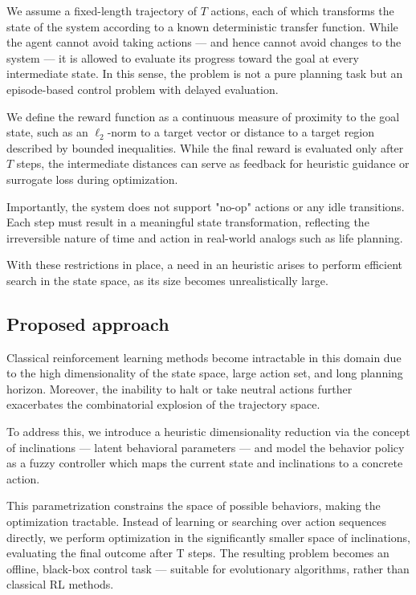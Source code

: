 \documentclass[11pt, a4paper]{article}
\begin{document}
We assume a fixed-length trajectory of $𝑇$ actions, each of which transforms the state of the system according to a known deterministic transfer function. While the agent cannot avoid taking actions — and hence cannot avoid changes to the system — it is allowed to evaluate its progress toward the goal at every intermediate state. In this sense, the problem is not a pure planning task but an episode-based control problem with delayed evaluation.

We define the reward function as a continuous measure of proximity to the goal state, such as an $\ell_2$-norm to a target vector or distance to a target region described by bounded inequalities. While the final reward is evaluated only after $𝑇$ steps, the intermediate distances can serve as feedback for heuristic guidance or surrogate loss during optimization.

Importantly, the system does not support "no-op" actions or any idle transitions. Each step must result in a meaningful state transformation, reflecting the irreversible nature of time and action in real-world analogs such as life planning.

	With these restrictions in place, a need in an heuristic arises to perform efficient search in the state space, as its size becomes unrealistically large.
	
	\subsection{Proposed approach}

Classical reinforcement learning methods become intractable in this domain due to the high dimensionality of the state space, large action set, and long planning horizon. Moreover, the inability to halt or take neutral actions further exacerbates the combinatorial explosion of the trajectory space.

To address this, we introduce a heuristic dimensionality reduction via the concept of inclinations — latent behavioral parameters — and model the behavior policy as a fuzzy controller which maps the current state and inclinations to a concrete action.

This parametrization constrains the space of possible behaviors, making the optimization tractable. Instead of learning or searching over action sequences directly, we perform optimization in the significantly smaller space of inclinations, evaluating the final outcome after T steps. The resulting problem becomes an offline, black-box control task — suitable for evolutionary algorithms, rather than classical RL methods.
\end{document}
